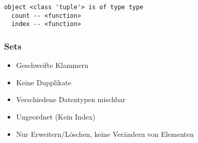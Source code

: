 \documentclass[11pt]{article}
\providecommand{\tightlist}{%
      \setlength{\itemsep}{0pt}\setlength{\parskip}{0pt}}
\begin{document}
    \begin{Verbatim}[commandchars=\\\{\}]
object <class 'tuple'> is of type type
  count -- <function>
  index -- <function>
    \end{Verbatim}

    \hypertarget{sets}{%
\subsubsection{Sets}\label{sets}}

\begin{itemize}
\tightlist
\item
  Geschweifte Klammern
\item
  Keine Dupplikate
\item
  Verschiedene Datentypen mischbar
\item
  Ungeordnet (Kein Index)
\item
  Nur Erweitern/Löschen, keine Verändern von Elementen
\end{itemize}
\end{document}
